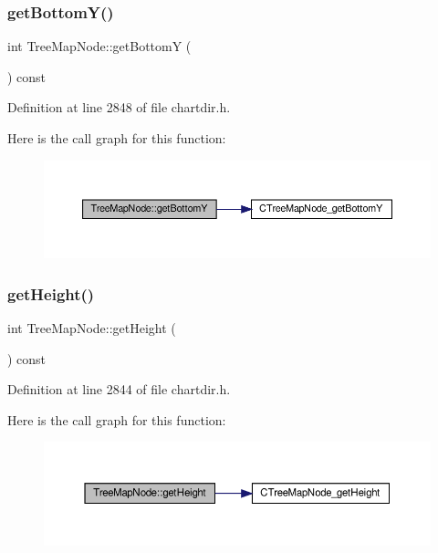 \subsubsection{\texorpdfstring{get\+Bottom\+Y()}{getBottomY()}}
{\footnotesize\ttfamily int Tree\+Map\+Node\+::get\+BottomY (\begin{DoxyParamCaption}{ }\end{DoxyParamCaption}) const\hspace{0.3cm}{\ttfamily [inline]}}



Definition at line 2848 of file chartdir.\+h.

Here is the call graph for this function\+:
\nopagebreak
\begin{figure}[H]
\begin{center}
\leavevmode
\includegraphics[width=350pt]{class_tree_map_node_ae8e084cd21a03ecc16b8c70601424f19_cgraph}
\end{center}
\end{figure}
\mbox{\label{class_tree_map_node_ad2194072974f9c46d48be27d517fd984}} 
\subsubsection{\texorpdfstring{get\+Height()}{getHeight()}}
{\footnotesize\ttfamily int Tree\+Map\+Node\+::get\+Height (\begin{DoxyParamCaption}{ }\end{DoxyParamCaption}) const\hspace{0.3cm}{\ttfamily [inline]}}



Definition at line 2844 of file chartdir.\+h.

Here is the call graph for this function\+:
\nopagebreak
\begin{figure}[H]
\begin{center}
\leavevmode
\includegraphics[width=350pt]{class_tree_map_node_ad2194072974f9c46d48be27d517fd984_cgraph}
\end{center}
\end{figure}
\mbox{\label{class_tree_map_node_a716c1465852f037e6b75e14b8865b841}} 
